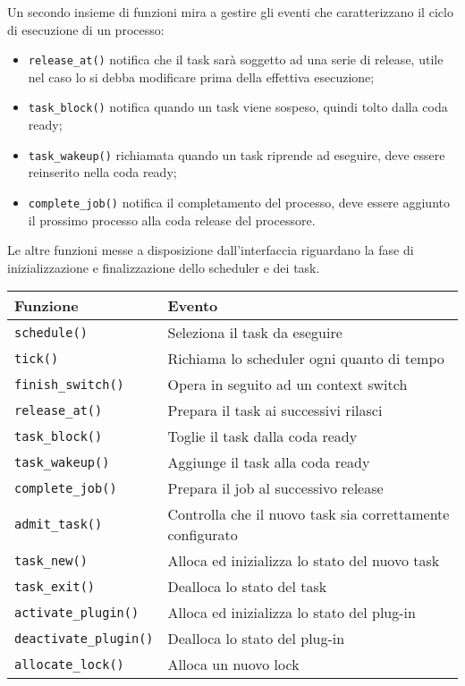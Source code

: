\begin{appendices}
\noindent Un secondo insieme di funzioni mira a gestire gli eventi che caratterizzano il ciclo di esecuzione di un processo:\\

\begin{itemize}
	\item \texttt{release\_at()} notifica che il task sarà soggetto ad una serie di release, utile nel caso lo si debba modificare prima della effettiva esecuzione;
	\item \texttt{task\_block()} notifica quando un task viene sospeso, quindi tolto dalla coda ready;
	\item \texttt{task\_wakeup()} richiamata quando un task riprende ad eseguire, deve essere reinserito nella coda ready;
	\item \texttt{complete\_job()} notifica il completamento del processo, deve essere aggiunto il prossimo processo alla coda release del processore.\\
\end{itemize}

\noindent Le altre funzioni messe a disposizione dall'interfaccia riguardano la fase di inizializzazione e finalizzazione dello scheduler e dei task.\\

\begin{table}
  \centering
  \begin{tabular}{|ll|}
	\hline
	    Funzione & Evento \\ \hline \hline
	   
\texttt{schedule()} 			&	Seleziona il task da eseguire \\
\texttt{tick()} 				&	Richiama lo scheduler ogni quanto di tempo \\
\texttt{finish\_switch()}		&	Opera in seguito ad un context switch \\
\hline
\texttt{release\_at()}			&	Prepara il task ai successivi rilasci \\
\texttt{task\_block()}			&	Toglie il task dalla coda ready \\
\texttt{task\_wakeup()}			&	Aggiunge il task alla coda ready \\
\texttt{complete\_job()}		&	Prepara il job al successivo release \\
\hline
\texttt{admit\_task()}			&	Controlla che il nuovo task sia correttamente configurato \\
\texttt{task\_new()}			&	Alloca ed inizializza lo stato del nuovo task \\
\texttt{task\_exit()}			&	Dealloca lo stato del task \\
\hline
\texttt{activate\_plugin()}		&	Alloca ed inizializza lo stato del plug-in \\
\texttt{deactivate\_plugin()}	&	Dealloca lo stato del plug-in \\
\hline
\texttt{allocate\_lock()}		&	Alloca un nuovo lock \\
  	

\end{tabular}
\end{table}
\end{appendices}
